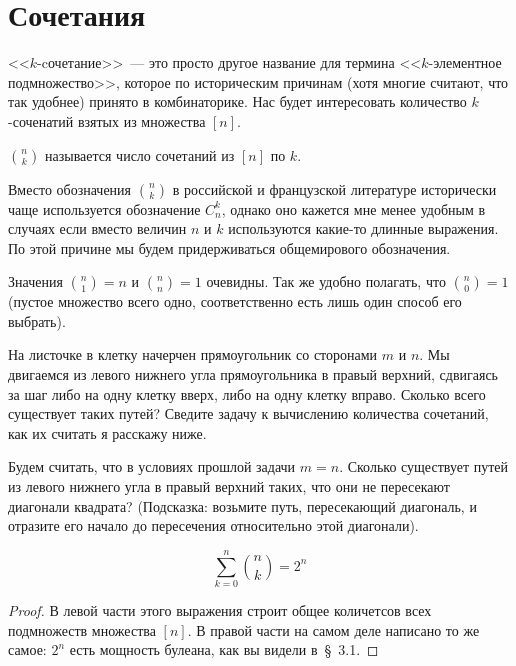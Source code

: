 \section{Сочетания}

<<$k$-cочетание>>~--- это просто другое название для термина <<$k$-элементное подмножество>>, которое по историческим причинам (хотя многие считают, что так удобнее) принято в комбинаторике. Нас будет интересовать количество $k$-соченатий взятых из множества $[n]$.

\begin{definition}
 $n \choose k$ называется число сочетаний из $[n]$ по $k$.
\end{definition}

Вместо обозначения ${n \choose k}$ в российской и французской литературе исторически чаще используется обозначение $C^k_n$, однако оно кажется мне менее удобным в случаях если вместо величин $n$ и $k$ используются какие-то длинные выражения. По этой причине мы будем придерживаться общемирового обозначения.

Значения ${n \choose 1} = n$ и ${n \choose n} = 1$ очевидны. Так же удобно полагать, что ${n \choose 0} =1$ (пустое множество всего одно, соответственно есть лишь один способ его выбрать). 

\begin{exercise}
На листочке в клетку начерчен прямоугольник со сторонами $m$ и $n$. Мы двигаемся из левого нижнего угла прямоугольника в правый верхний, сдвигаясь за шаг либо на одну клетку вверх, либо на одну клетку вправо. Сколько всего существует таких путей? Сведите задачу к вычислению количества сочетаний, как их считать я расскажу ниже.
\end{exercise}

\begin{exercise}
Будем считать, что в условиях прошлой задачи $m=n$. Сколько существует путей из левого нижнего угла в правый верхний таких, что они не пересекают диагонали квадрата? (Подсказка: возьмите путь, пересекающий диагональ, и отразите его начало до пересечения относительно этой диагонали).
\end{exercise}

\begin{thm}
$$\sum_{k=0}^n{n \choose k} = 2^n$$
\end{thm}
\begin{proof}
В левой части этого выражения строит общее количетсов всех подмножеств множества $[n]$. В правой части на самом деле написано то же самое: $2^n$ есть мощность булеана, как вы видели в~\S~3.1.
\end{proof}

